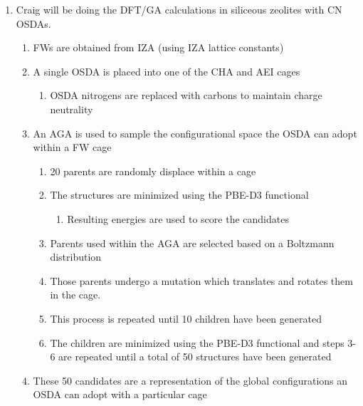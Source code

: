 \documentclass[journal=accacs,manuscript=article, email=true, layout=traditional]{achemso}
\begin{document}
\begin{enumerate}
\item Craig will be doing the DFT/GA calculations in siliceous zeolites with CN OSDAs.
\begin{enumerate}
\item FWs are obtained from IZA (using IZA lattice constants)
\item A single OSDA is placed into one of the CHA and AEI cages
\begin{enumerate}
\item OSDA nitrogens are replaced with carbons to maintain charge neutrality
\end{enumerate}
\item An AGA is used to sample the configurational space the OSDA can adopt within a FW cage
\begin{enumerate}
\item 20 parents are randomly displace within a cage
\item The structures are minimized using the PBE-D3 functional
\begin{enumerate}
\item Resulting energies are used to score the candidates
\end{enumerate}
\item Parents used within the AGA are selected based on a Boltzmann distribution
\item Those parents undergo a mutation which translates and rotates them in the cage.
\item This process is repeated until 10 children have been generated
\item The children are minimized using the PBE-D3 functional and steps 3-6 are repeated until a total of 50 structures have been generated
\end{enumerate}
\item These 50 candidates are a representation of the global configurations an OSDA can adopt with a particular cage
\end{enumerate}

\begin{figure}
\begin{center}


\end{center}
\end{figure}
\end{enumerate}
\end{document}
